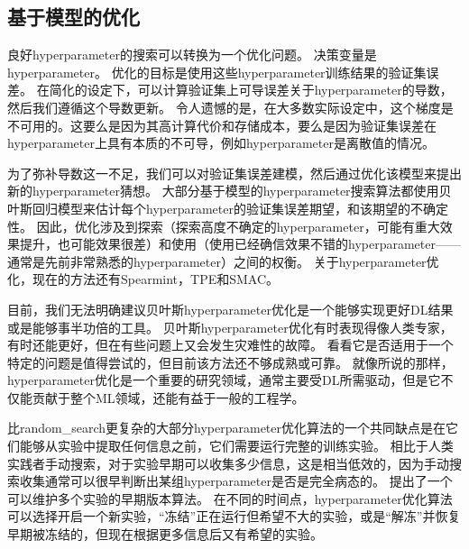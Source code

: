 
\subsection{基于模型的优化}
\label{sec:model_based_hyperparameter_optimization}
良好\gls{hyperparameter}的搜索可以转换为一个优化问题。
决策变量是\gls{hyperparameter}。
优化的目标是使用这些\gls{hyperparameter}训练结果的验证集误差。
在简化的设定下，可以计算验证集上可导误差关于\gls{hyperparameter}的导数，然后我们遵循这个导数更新\citep{bengio:1999:snowbird,bengio-hyper-NC00,maclaurin2015gradient}。
令人遗憾的是，在大多数实际设定中，这个梯度是不可用的。这要么是因为其高计算代价和存储成本，要么是因为验证集误差在\gls{hyperparameter}上具有本质的不可导，例如\gls{hyperparameter}是离散值的情况。

为了弥补导数这一不足，我们可以对验证集误差建模，然后通过优化该模型来提出新的\gls{hyperparameter}猜想。
大部分基于模型的\gls{hyperparameter}搜索算法都使用贝叶斯回归模型来估计每个\gls{hyperparameter}的验证集误差期望，和该期望的不确定性。
因此，优化涉及到探索（探索高度不确定的\gls{hyperparameter}，可能有重大效果提升，也可能效果很差）和使用（使用已经确信效果不错的\gls{hyperparameter}——通常是先前非常熟悉的\gls{hyperparameter}）之间的权衡。
关于\gls{hyperparameter}优化，现在的方法还有Spearmint\citep{Snoek+al-NIPS2012-small}，TPE\citep{Bergstra+al-NIPS2011}和SMAC\citep{hutter+hoos+leyton+brown:2011}。

目前，我们无法明确建议贝叶斯\gls{hyperparameter}优化是一个能够实现更好\gls{DL}结果或是能够事半功倍的工具。
贝叶斯\gls{hyperparameter}优化有时表现得像人类专家，有时还能更好，但在有些问题上又会发生灾难性的故障。
看看它是否适用于一个特定的问题是值得尝试的，但目前该方法还不够成熟或可靠。
就像所说的那样，\gls{hyperparameter}优化是一个重要的研究领域，通常主要受\gls{DL}所需驱动，但是它不仅能贡献于整个\gls{ML}领域，还能有益于一般的工程学。


比\gls{random_search}更复杂的大部分\gls{hyperparameter}优化算法的一个共同缺点是在它们能够从实验中提取任何信息之前，它们需要运行完整的训练实验。
相比于人类实践者手动搜索，对于实验早期可以收集多少信息，这是相当低效的，因为手动搜索收集通常可以很早判断出某组\gls{hyperparameter}是否是完全病态的。
\cite{swersky2014freeze}提出了一个可以维护多个实验的早期版本算法。
在不同的时间点，\gls{hyperparameter}优化算法可以选择开启一个新实验，``冻结''正在运行但希望不大的实验，或是``解冻''并恢复早期被冻结的，但现在根据更多信息后又有希望的实验。

